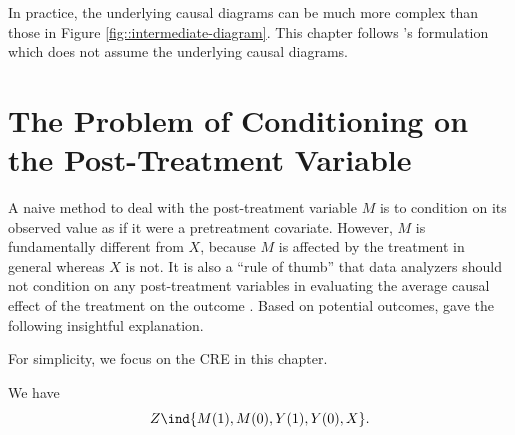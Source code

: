 In practice, the underlying causal diagrams can be much more complex than those in Figure \ref{fig::intermediate-diagram}. This chapter follows \citet{frangakis2002principal}'s formulation which does not assume the underlying causal diagrams.





\section{The Problem of Conditioning on the Post-Treatment Variable}

A naive method to deal with the post-treatment variable $M$ is to condition on its observed value as if it were a pretreatment covariate. However, $M$ is fundamentally different from $X$, because $M$ is affected by the treatment in general whereas $X$ is not. It is also a ``rule of thumb'' that data analyzers should not condition on any post-treatment variables in evaluating the average causal effect of the treatment on the outcome \citep{cochran1957analysis, rosenbaum1984consquences}. Based on potential outcomes, \citet{frangakis2002principal} gave the following insightful explanation. 

For simplicity, we focus on the CRE in this chapter.

\begin{assumption}
\label{assume::complete-randomization-withM}
We have
$$
Z \ind  \{ M(1), M(0), Y(1), Y(0), X \} . 
$$
\end{assumption}

